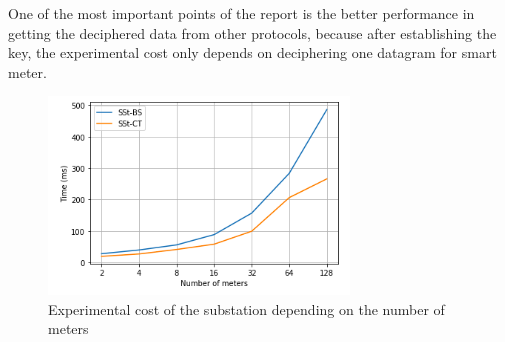 
	One of the most important points of the report is the better performance in getting the deciphered data from other protocols, because after establishing the key, the experimental cost only depends on deciphering one datagram for smart meter. 
	\begin{figure}[h!]
		\centering
		\includegraphics[width=8cm]{imgs/exp-cost-subst.png}
		\caption{Experimental cost of the substation depending on the number of meters}
	\end{figure}


